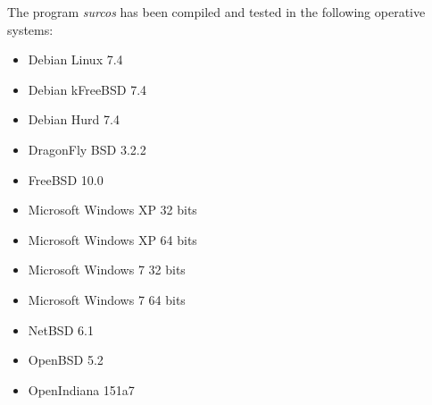 The program \emph{surcos} has been compiled and tested in the following
operative systems:
\begin{itemize}
\item Debian Linux 7.4
\item Debian kFreeBSD 7.4
\item Debian Hurd 7.4
\item DragonFly BSD 3.2.2
\item FreeBSD 10.0
\item Microsoft Windows XP 32 bits
\item Microsoft Windows XP 64 bits
\item Microsoft Windows 7 32 bits
\item Microsoft Windows 7 64 bits
\item NetBSD 6.1
\item OpenBSD 5.2
\item OpenIndiana 151a7
\end{itemize}
